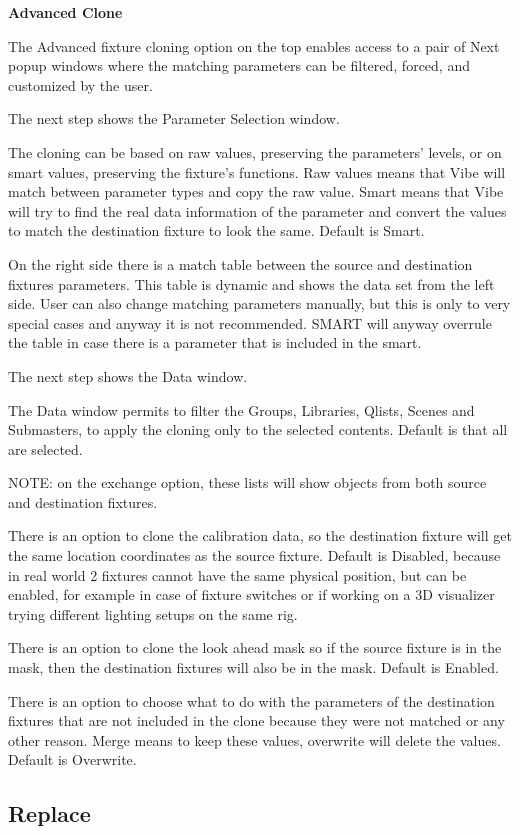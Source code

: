 \documentclass[
]{article}
\begin{document}
\textbf{Advanced Clone}

The Advanced fixture cloning option on the top enables access to a pair of Next popup windows where the matching parameters can be filtered, forced, and customized by the user.

The next step shows the Parameter Selection window.

The cloning can be based on raw values, preserving the parameters' levels, or on smart values, preserving the fixture's functions. Raw values means that Vibe will match between parameter types and copy the raw value. Smart means that Vibe will try to find the real data information of the parameter and convert the values to match the destination fixture to look the same. Default is Smart.

On the right side there is a match table between the source and destination fixtures parameters. This table is dynamic and shows the data set from the left side. User can also change matching parameters manually, but this is only to very special cases and anyway it is not recommended. SMART will anyway overrule the table in case there is a parameter that is included in the smart.

The next step shows the Data window.

The Data window permits to filter the Groups, Libraries, Qlists, Scenes and Submasters, to apply the cloning only to the selected contents. Default is that all are selected.

NOTE: on the exchange option, these lists will show objects from both source and destination fixtures.

There is an option to clone the calibration data, so the destination fixture will get the same location coordinates as the source fixture. Default is Disabled, because in real world 2 fixtures cannot have the same physical position, but can be enabled, for example in case of fixture switches or if working on a 3D visualizer trying different lighting setups on the same rig.

There is an option to clone the look ahead mask so if the source fixture is in the mask, then the destination fixtures will also be in the mask. Default is Enabled.

There is an option to choose what to do with the parameters of the destination fixtures that are not included in the clone because they were not matched or any other reason. Merge means to keep these values, overwrite will delete the values. Default is Overwrite.

\hypertarget{Replace-5.9}{%
\subsection{Replace}\label{Replace-5.9}}
\end{document}
